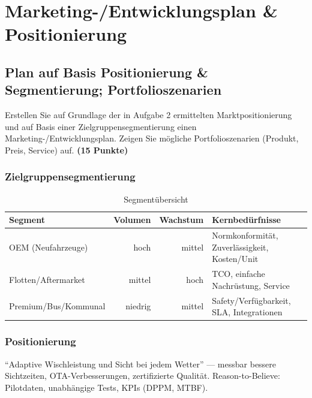 \documentclass[
%
ngerman %
%
numeric %
]{wbh-assignment}
\begin{document}
\clearpage

\section{Marketing-/Entwicklungsplan \& Positionierung}
\label{sec:marketing_plan}

\subsection{Plan auf Basis Positionierung \& Segmentierung; Portfolioszenarien}
\begin{aufgabenstellung}
Erstellen Sie auf Grundlage der in Aufgabe 2 ermittelten Marktpositionierung und auf Basis einer Zielgruppensegmentierung einen Marketing-/Entwicklungsplan. Zeigen Sie mögliche Portfolioszenarien (Produkt, Preis, Service) auf. \textbf{(15 Punkte)}
\end{aufgabenstellung}

\vspace*{5mm}

\subsubsection{Zielgruppensegmentierung}
\begin{table}[htb!]
\centering
\caption{Segmentübersicht}
\begin{tabular}{l r r l}
\textbf{Segment} & \textbf{Volumen} & \textbf{Wachstum} & \textbf{Kernbedürfnisse} \\
\hline
OEM (Neufahrzeuge) & hoch & mittel & Normkonformität, Zuverlässigkeit, Kosten/Unit \\
Flotten/Aftermarket & mittel & hoch & TCO, einfache Nachrüstung, Service \\
Premium/Bus/Kommunal & niedrig & mittel & Safety/Verfügbarkeit, SLA, Integrationen \\
\end{tabular}
\end{table}

\subsubsection{Positionierung}
``Adaptive Wischleistung und Sicht bei jedem Wetter'' --- messbar bessere Sichtzeiten, OTA-Verbesserungen, zertifizierte Qualität. Reason-to-Believe: Pilotdaten, unabhängige Tests, KPIs (DPPM, MTBF).
\end{document}
